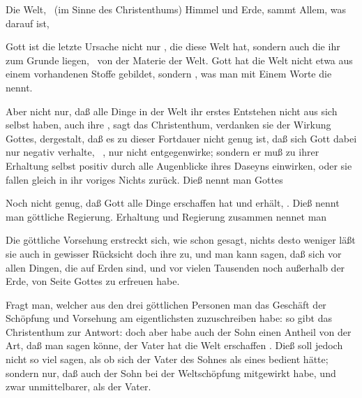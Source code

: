 \begin{aufza}
\item Die Welt, \dh\ (im Sinne des Christenthums) Himmel und Erde, sammt Allem, was darauf ist, 
\item Gott ist die letzte Ursache nicht nur , die diese Welt hat, sondern auch  die ihr zum Grunde liegen, \dh\ von der Materie der Welt. Gott hat die Welt nicht etwa aus einem vorhandenen Stoffe gebildet, sondern , was man mit Einem Worte die  nennt.
\item Aber nicht nur, daß alle Dinge in der Welt ihr erstes Entstehen nicht aus sich selbst haben, auch ihre , sagt das Christenthum, verdanken sie der Wirkung Gottes, dergestalt, daß es zu dieser Fortdauer nicht genug ist, daß sich Gott dabei nur negativ verhalte, \dh\ , nur nicht entgegenwirke; sondern er muß zu ihrer Erhaltung selbst positiv durch alle Augenblicke ihres Daseyns einwirken, oder sie fallen gleich in ihr voriges Nichts zurück. Dieß nennt man Gottes 
\item Noch nicht genug, daß Gott alle Dinge erschaffen hat und erhält, . Dieß nennt man göttliche Regierung. Erhaltung und Regierung zusammen nennet man 
\item Die göttliche Vorsehung erstreckt sich, wie schon gesagt,  nichts desto weniger läßt sie auch in gewisser Rücksicht doch ihre  zu, und man kann sagen, daß sich vor allen Dingen, die auf Erden sind, und vor vielen Tausenden noch außerhalb der Erde,  von Seite Gottes zu erfreuen habe.
\item Fragt man, welcher aus den drei göttlichen Personen man das Geschäft der Schöpfung und Vorsehung am eigentlichsten zuzuschreiben habe: so gibt das Christenthum zur Antwort:  doch aber habe auch der Sohn einen Antheil von der Art, daß man sagen könne, der Vater hat die Welt erschaffen . Dieß soll jedoch nicht so viel sagen, als ob sich der Vater des Sohnes als eines  bedient hätte; sondern nur, daß auch der Sohn bei der Weltschöpfung mitgewirkt habe, und zwar unmittelbarer, als der Vater.~
\end{aufza}

